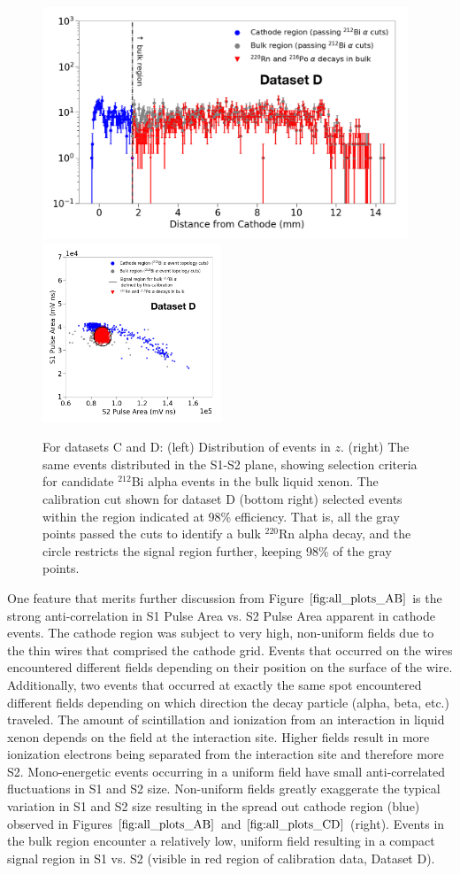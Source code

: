 \begin{figure}[hbtp]
\includegraphics[width=4.3in]{figures/radon/hist_calib_label.png}\includegraphics[width=2.1in]{figures/radon/signalregion_calib_label.png}\\
\caption{For datasets C and D: (left) Distribution of events in $z$. (right) The same events distributed in the S1-S2 plane, showing selection criteria for candidate $^{212}$Bi alpha events in the bulk liquid xenon. The calibration cut shown for dataset D (bottom right) selected events within the region indicated at 98\% efficiency. That is, all the gray points passed the cuts to identify a bulk  $^{220}$Rn alpha decay, and the circle restricts the signal region further, keeping 98\% of the gray points. } 
\label{fig:all_plots_CD}
\end{figure}


One feature that merits further discussion from Figure $\ref{fig:all_plots_AB}$ is the strong anti-correlation in S1 Pulse Area vs. S2 Pulse Area apparent in cathode events. The cathode region was subject to very high, non-uniform fields due to the thin wires that comprised the cathode grid. Events that occurred on the wires encountered different fields depending on their position on the surface of the wire. Additionally, two events that occurred at exactly the same spot encountered different fields depending on which direction the decay particle (alpha, beta, etc.) traveled. The amount of scintillation and ionization from an interaction in liquid xenon depends on the field at the interaction site. Higher fields result in more ionization electrons being separated from the interaction site and therefore more S2. Mono-energetic events occurring in a uniform field have small anti-correlated fluctuations in S1 and S2 size. Non-uniform fields greatly exaggerate the typical variation in S1 and S2 size resulting in the spread out cathode region (blue) observed in Figures $\ref{fig:all_plots_AB}$ and $\ref{fig:all_plots_CD}$  (right). Events in the bulk region encounter a relatively low, uniform field resulting in a compact signal region in S1 vs. S2 (visible in red region of calibration data, Dataset D). 

